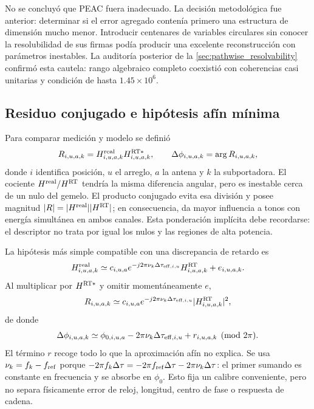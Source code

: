 No se concluyó que PEAC fuera inadecuado. La decisión metodológica fue anterior:
determinar si el error agregado contenía primero una estructura de dimensión mucho
menor. Introducir centenares de variables circulares sin conocer la resolubilidad
de sus firmas podía producir una excelente reconstrucción con parámetros inestables.
La auditoría posterior de la \cref{sec:pathwise_resolvability} confirmó esta cautela:
rango algebraico completo coexistió con coherencias casi unitarias y condición de
hasta $1.45\times10^6$.

\subsection{Residuo conjugado e hipótesis afín mínima}

Para comparar medición y modelo se definió
\begin{equation}
R_{i,u,a,k}=
H^{\rm real}_{i,u,a,k}H^{{\rm RT}*}_{i,u,a,k},
\qquad
\Delta\phi_{i,u,a,k}=\arg R_{i,u,a,k},
\label{eq:complex_phase_residual}
\end{equation}
donde $i$ identifica posición, $u$ el arreglo, $a$ la antena y $k$ la
subportadora. El cociente $H^{\rm real}/H^{\rm RT}$ tendría la misma diferencia
angular, pero es inestable cerca de un nulo del gemelo. El producto conjugado evita
esa división y posee magnitud
$|R|=|H^{\rm real}||H^{\rm RT}|$; en consecuencia, da mayor influencia a tonos con
energía simultánea en ambos canales. Esta ponderación implícita debe recordarse:
el descriptor no trata por igual los nulos y las regiones de alta potencia.

La hipótesis más simple compatible con una discrepancia de retardo es
\begin{equation}
H^{\rm real}_{i,u,a,k}
\simeq c_{i,u,a}
e^{-j2\pi\nu_k\Delta\tau_{{\rm eff},i,u}}
H^{\rm RT}_{i,u,a,k}+e_{i,u,a,k}.
\label{eq:aggregate_delay_hypothesis}
\end{equation}
Al multiplicar por $H^{{\rm RT}*}$ y omitir momentáneamente $e$,
\begin{equation}
R_{i,u,a,k}\simeq
c_{i,u,a}e^{-j2\pi\nu_k\Delta\tau_{{\rm eff},i,u}}
|H^{\rm RT}_{i,u,a,k}|^2,
\end{equation}
de donde
\begin{equation}
\Delta\phi_{i,u,a,k}\simeq
\phi_{0,i,u,a}-2\pi\nu_k\Delta\tau_{{\rm eff},i,u}+r_{i,u,a,k}
\pmod{2\pi}.
\label{eq:first_affine_phase_model}
\end{equation}
El término $r$ recoge todo lo que la aproximación afín no explica. Se usa
$\nu_k=f_k-f_{\rm ref}$ porque
$-2\pi f_k\Delta\tau=-2\pi f_{\rm ref}\Delta\tau
-2\pi\nu_k\Delta\tau$: el primer sumando es constante en frecuencia y se absorbe
en $\phi_0$. Esto fija un calibre conveniente, pero no separa físicamente error de
reloj, longitud, centro de fase o respuesta de cadena.

